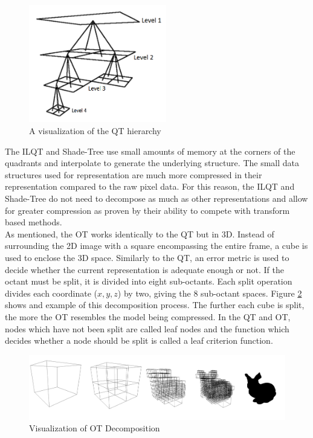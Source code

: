 \begin{figure}[!htb]
\centering
\includegraphics[width=6cm]{images/ch2/QuadTreeHierarchy}
\caption{A visualization of the QT hierarchy}
\label{QuadTreeHierarchy}
\end{figure}

The ILQT and Shade-Tree use small amounts of memory at the corners of the quadrants and interpolate to generate the underlying structure. The small data structures used for representation are much more compressed in their representation compared to the raw pixel data. For this reason, the ILQT and Shade-Tree do not need to decompose as much as other representations and allow for greater compression as proven by their ability to compete with transform based methods. \\

As mentioned, the OT works identically to the QT but in 3D. Instead of surrounding the 2D image with a square encompassing the entire frame, a cube is used to enclose the 3D space. Similarly to the QT, an error metric is used to decide whether the current representation is adequate enough or not. If the octant must be split, it is divided into eight sub-octants. Each split operation divides each coordinate ($x,y,z$) by two, giving the 8 sub-octant spaces. Figure \ref{OctreeExample} shows and example of this decomposition process. The further each cube is split, the more the OT resembles the model being compressed. In the QT and OT, nodes which have not been split are called leaf nodes and the function which decides whether a node should be split is called a leaf criterion function. \\ 

\begin{figure}[!htb]
\centering
\includegraphics[width=16cm]{images/ch2/OctreeExample}
\caption{Visualization of OT Decomposition}
\label{OctreeExample}
\end{figure}

